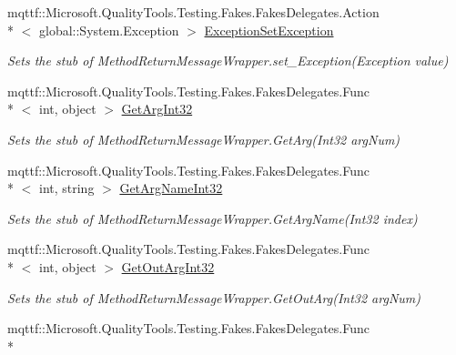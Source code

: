 \begin{DoxyCompactItemize}
mqttf\-::\-Microsoft.\-Quality\-Tools.\-Testing.\-Fakes.\-Fakes\-Delegates.\-Action\\*
$<$ global\-::\-System.\-Exception $>$ \hyperlink{class_system_1_1_runtime_1_1_remoting_1_1_messaging_1_1_fakes_1_1_stub_method_return_message_wrapper_a353937ab7c7d72ae6253cc64f672477f}{Exception\-Set\-Exception}
\begin{DoxyCompactList}\small\item\em Sets the stub of Method\-Return\-Message\-Wrapper.\-set\-\_\-\-Exception(\-Exception value)\end{DoxyCompactList}\item 
mqttf\-::\-Microsoft.\-Quality\-Tools.\-Testing.\-Fakes.\-Fakes\-Delegates.\-Func\\*
$<$ int, object $>$ \hyperlink{class_system_1_1_runtime_1_1_remoting_1_1_messaging_1_1_fakes_1_1_stub_method_return_message_wrapper_a1e76f1b1c9f3cff3a2401c281ead57b0}{Get\-Arg\-Int32}
\begin{DoxyCompactList}\small\item\em Sets the stub of Method\-Return\-Message\-Wrapper.\-Get\-Arg(\-Int32 arg\-Num)\end{DoxyCompactList}\item 
mqttf\-::\-Microsoft.\-Quality\-Tools.\-Testing.\-Fakes.\-Fakes\-Delegates.\-Func\\*
$<$ int, string $>$ \hyperlink{class_system_1_1_runtime_1_1_remoting_1_1_messaging_1_1_fakes_1_1_stub_method_return_message_wrapper_a31de97c8261a350c44035e27fab2d188}{Get\-Arg\-Name\-Int32}
\begin{DoxyCompactList}\small\item\em Sets the stub of Method\-Return\-Message\-Wrapper.\-Get\-Arg\-Name(\-Int32 index)\end{DoxyCompactList}\item 
mqttf\-::\-Microsoft.\-Quality\-Tools.\-Testing.\-Fakes.\-Fakes\-Delegates.\-Func\\*
$<$ int, object $>$ \hyperlink{class_system_1_1_runtime_1_1_remoting_1_1_messaging_1_1_fakes_1_1_stub_method_return_message_wrapper_a2a4cc7820a92e61109e42ef704873e5e}{Get\-Out\-Arg\-Int32}
\begin{DoxyCompactList}\small\item\em Sets the stub of Method\-Return\-Message\-Wrapper.\-Get\-Out\-Arg(\-Int32 arg\-Num)\end{DoxyCompactList}\item 
mqttf\-::\-Microsoft.\-Quality\-Tools.\-Testing.\-Fakes.\-Fakes\-Delegates.\-Func\\*

\end{DoxyCompactItemize}
